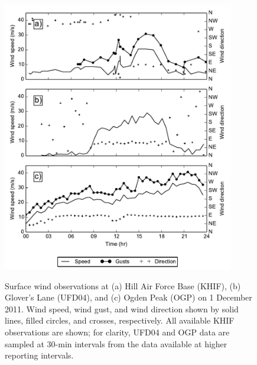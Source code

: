 \documentclass[pdftex,12pt]{article}
\def\mps{m\,s$^{-1}$}
\begin{document}
\begin{figure}[t]
\centering
\includegraphics[width=0.9\textwidth]{obs_comp.pdf}\\
\caption{Surface wind observations at (a) Hill Air Force Base (KHIF), (b) Glover's Lane (UFD04), and (c) Ogden Peak (OGP) on 1 December 2011. Wind speed, wind gust, and wind direction shown by solid lines, filled circles, and crosses, respectively. All available KHIF observations are shown; for clarity, UFD04 and OGP data are sampled at 30-min intervals from the data available at higher reporting intervals.}
\label{fig:ob_ts}
\end{figure}


\end{document}
